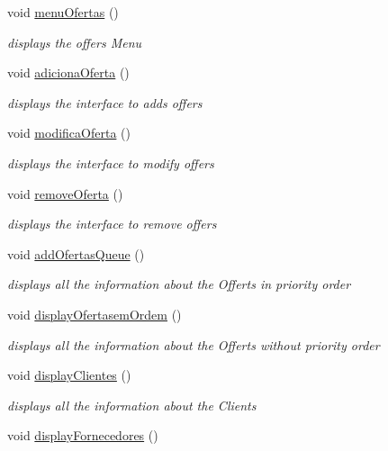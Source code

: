 \begin{DoxyCompactItemize}
void \hyperlink{classEmpresa_a3cab1a61ff84c5b20ac2faa6251e25ed}{menu\+Ofertas} ()
\begin{DoxyCompactList}\small\item\em displays the offers Menu \end{DoxyCompactList}\item 
void \hyperlink{classEmpresa_ae244a8ae3afb85eb5e9e5febce8b8728}{adiciona\+Oferta} ()
\begin{DoxyCompactList}\small\item\em displays the interface to adds offers \end{DoxyCompactList}\item 
void \hyperlink{classEmpresa_ac8948065c65d5c02cb30103118f502d4}{modifica\+Oferta} ()
\begin{DoxyCompactList}\small\item\em displays the interface to modify offers \end{DoxyCompactList}\item 
void \hyperlink{classEmpresa_a5b5c42d733ccee37f932db5db8aec243}{remove\+Oferta} ()
\begin{DoxyCompactList}\small\item\em displays the interface to remove offers \end{DoxyCompactList}\item 
void \hyperlink{classEmpresa_a5ca8821d938f11f29558ae90913de528}{add\+Ofertas\+Queue} ()
\begin{DoxyCompactList}\small\item\em displays all the information about the Offerts in priority order \end{DoxyCompactList}\item 
void \hyperlink{classEmpresa_acd458614a3cca3f432b54212a2e72584}{display\+Ofertasem\+Ordem} ()
\begin{DoxyCompactList}\small\item\em displays all the information about the Offerts without priority order \end{DoxyCompactList}\item 
void \hyperlink{classEmpresa_a28e04d59daa7206bec6055249ce17410}{display\+Clientes} ()
\begin{DoxyCompactList}\small\item\em displays all the information about the Clients \end{DoxyCompactList}\item 
void \hyperlink{classEmpresa_a55c3756c01b45b41ad03f4e4f3e4dcac}{display\+Fornecedores} ()

\end{DoxyCompactItemize}
